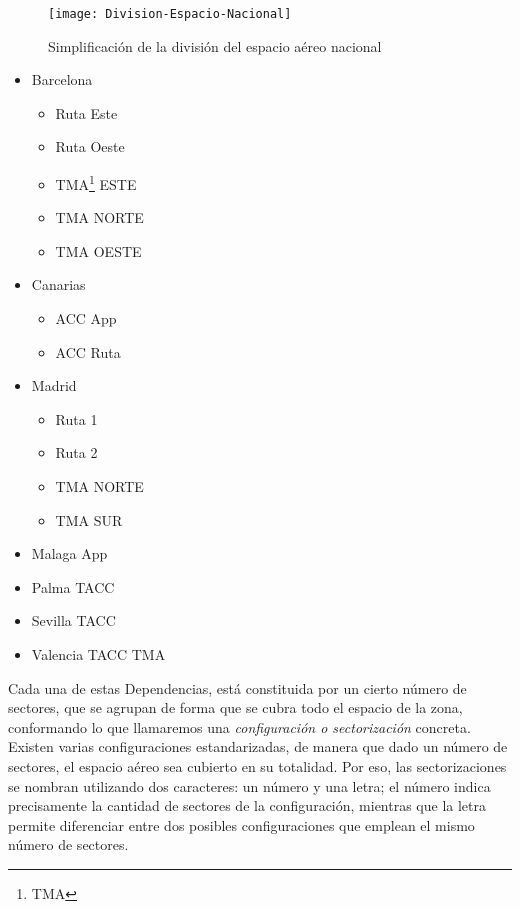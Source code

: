 \begin{figure}
    \centering
    \texttt{[image: Division-Espacio-Nacional]}
    \caption{Simplificación de la división del espacio aéreo nacional}
    \label{fig:2:regiones}
\end{figure}

\begin{itemize}
    \item Barcelona
    \begin{itemize}
        \item Ruta Este
        \item Ruta Oeste
        \item TMA\footnote{\acrlong{TMA}} ESTE
        \item TMA NORTE
        \item TMA OESTE
    \end{itemize}
    \item Canarias
    \begin{itemize}
        \item ACC App
        \item ACC Ruta
    \end{itemize}
    \item Madrid
    \begin{itemize}
        \item Ruta 1
        \item Ruta 2
        \item TMA NORTE
        \item TMA SUR
    \end{itemize}
    \item Malaga App
    \item Palma TACC
    \item Sevilla TACC
    \item Valencia TACC TMA
\end{itemize}

Cada una de estas Dependencias, está constituida por un cierto número de sectores, que se agrupan de forma que se cubra
todo el espacio de la zona, conformando lo que llamaremos una \textit{configuración o sectorización} concreta.
Existen varias configuraciones estandarizadas, de manera que dado un número de sectores, el espacio aéreo sea cubierto 
en su totalidad.
Por eso, las sectorizaciones se nombran utilizando dos caracteres: un número y una letra; el número indica precisamente
la cantidad de sectores de la configuración, mientras que la letra permite diferenciar entre dos posibles 
configuraciones
que emplean el mismo número de sectores.
\\

